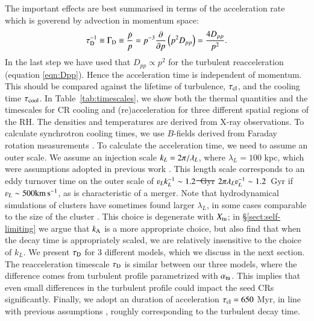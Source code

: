 \documentclass[fleqn,usenatbib,useAMS]{mnras}
\newcommand\cp[1]{{\color{red} #1}}
\begin{document}
The important effects are best summarised in terms of the acceleration \cp{rate
  which is goverend by advection in momentum space:
\begin{equation}
  \tau_{\rm D}^{-1}\equiv \Gamma_{\rm D}\equiv
  \frac{\dot{p}}{p}=p^{-3}\frac{\partial}{\partial p}\left(p^2D_{pp}\right)
  =\frac{4 D_{pp}}{p^{2}}.
\end{equation}
In the last step we have used that $D_{pp}\propto p^2$ for the turbulent
reacceleration (equation \ref{eqn:Dpp}). Hence the acceleration time is independent of momentum.}
This should be compared against the lifetime of turbulence, $\tau_{\rm cl}$, and the cooling time $\tau_{\rm cool}$. In Table~\ref{tab:timescales}, we show both the thermal quantities and the
timescales for CR cooling and (re)acceleration for three different
spatial regions of the RH. The densities \citep{1992A&A...259L..31B} and temperatures \citep{2009ApJ...696.1886B,2001A&A...365L..67A} are derived from X-ray observations. To calculate synchrotron cooling times, we use $B$-fields derived from Faraday rotation measurements \citep{bonafede10}. To calculate the acceleration time, we need to assume an outer scale. We assume an injection scale $k_L=2\pi/\lambda_L$, where $\lambda_L = 100$ kpc, which were assumptions adopted in previous work \citep{2006MNRAS.366.1437S,brunetti07, brunetti11}. This length scale corresponds to an eddy turnover time on the outer scale of \cp{\sout{$\varv_L k_L^{-1} \sim 1.2$~Gyr} $2\upi\lambda_L\varv_L^{-1} \sim 1.2$~Gyr} if $\varv_L \sim 500 {\rm km \, s^{-1}}$, as is characteristic of a merger. Note that hydrodynamical simulations of clusters have sometimes found larger $\lambda_L$, in some cases comparable to the size of the cluster \citep{vazza11,miniati15}. This choice is degenerate with $X_{\rm tu}$; in \S\ref{sect:self-limiting} we argue that $k_{\rm A}$ is a more appropriate choice, but also find that when the decay time is appropriately scaled, we are relatively insensitive to the choice of $k_L$. We present $\tau_{\rm D}$ for 3 different models, which we discuss in the next section. The reacceleration timescale
$\tau_{\rm D}$ is similar between our three models, where the
difference comes from turbulent profile parametrized with
$\alpha_{\mathrm{tu}}$. This implies that even small differences in the
turbulent profile could impact the seed CRs significantly. Finally, we adopt an duration of acceleration $\tau_{\rm cl} = 650$ Myr, in line with previous assumptions \citep{brunetti07}, roughly corresponding to the turbulent decay time. 
\end{document}
